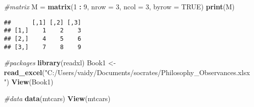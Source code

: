\documentclass[
]{article}
\newenvironment{Shaded}{\begin{snugshade}}{\end{snugshade}}
\newcommand{\AttributeTok}[1]{\textcolor[rgb]{0.13,0.29,0.53}{#1}}
\newcommand{\CommentTok}[1]{\textcolor[rgb]{0.56,0.35,0.01}{\textit{#1}}}
\newcommand{\ConstantTok}[1]{\textcolor[rgb]{0.56,0.35,0.01}{#1}}
\newcommand{\DecValTok}[1]{\textcolor[rgb]{0.00,0.00,0.81}{#1}}
\newcommand{\FunctionTok}[1]{\textcolor[rgb]{0.13,0.29,0.53}{\textbf{#1}}}
\newcommand{\NormalTok}[1]{#1}
\newcommand{\OtherTok}[1]{\textcolor[rgb]{0.56,0.35,0.01}{#1}}
\newcommand{\SpecialCharTok}[1]{\textcolor[rgb]{0.81,0.36,0.00}{\textbf{#1}}}
\newcommand{\StringTok}[1]{\textcolor[rgb]{0.31,0.60,0.02}{#1}}
\begin{document}
\begin{Shaded}
\begin{Highlighting}[]
\CommentTok{\#matrix}
\NormalTok{M }\OtherTok{=} \FunctionTok{matrix}\NormalTok{(}\DecValTok{1} \SpecialCharTok{:} \DecValTok{9}\NormalTok{, }\AttributeTok{nrow =} \DecValTok{3}\NormalTok{, }\AttributeTok{ncol =} \DecValTok{3}\NormalTok{, }\AttributeTok{byrow =} \ConstantTok{TRUE}\NormalTok{)}
\FunctionTok{print}\NormalTok{(M)}
\end{Highlighting}
\end{Shaded}

\begin{verbatim}
##      [,1] [,2] [,3]
## [1,]    1    2    3
## [2,]    4    5    6
## [3,]    7    8    9
\end{verbatim}

\begin{Shaded}
\begin{Highlighting}[]
\CommentTok{\#packages}
\FunctionTok{library}\NormalTok{(readxl)}
\NormalTok{Book1 }\OtherTok{\textless{}{-}} \FunctionTok{read\_excel}\NormalTok{(}\StringTok{"C:/Users/vaidy/Documents/socrates/Philosophy\_Observances.xlsx"}\NormalTok{)}
\FunctionTok{View}\NormalTok{(Book1)}

\CommentTok{\#data}
\FunctionTok{data}\NormalTok{(mtcars)}
\FunctionTok{View}\NormalTok{(mtcars)}
\end{Highlighting}
\end{Shaded}
\end{document}
